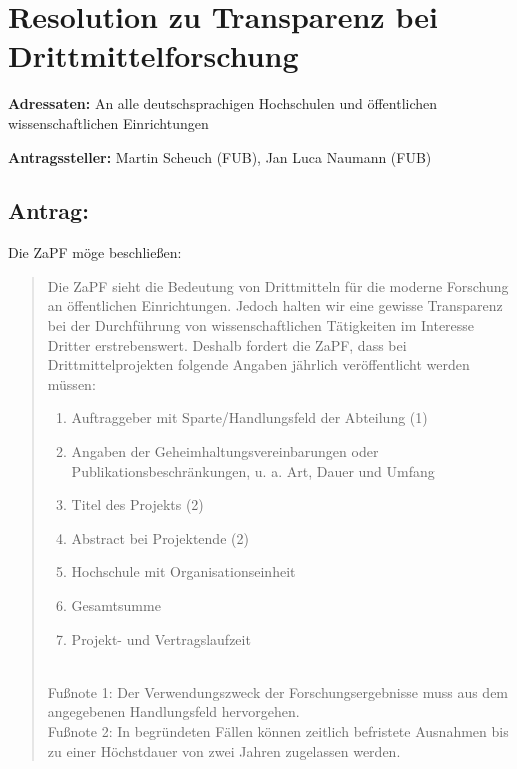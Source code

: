 \documentclass[10pt,oneside]{scrartcl}
\begin{document}
\section*{Resolution zu Transparenz bei Drittmittelforschung}

\textbf{Adressaten:} An alle deutschsprachigen Hochschulen und öffentlichen wissenschaftlichen Einrichtungen

\textbf{Antragssteller:} Martin Scheuch (FUB), Jan Luca Naumann (FUB)

\subsection*{Antrag:}
Die ZaPF möge beschließen:
\begin{quote}
Die ZaPF sieht die Bedeutung von Drittmitteln für die moderne Forschung an öffentlichen Einrichtungen. Jedoch halten wir eine gewisse Transparenz bei der Durchführung von wissenschaftlichen Tätigkeiten im Interesse Dritter erstrebenswert. Deshalb fordert die ZaPF, dass bei Drittmittelprojekten folgende Angaben jährlich veröffentlicht werden müssen:
\begin{enumerate}
\item Auftraggeber mit Sparte/Handlungsfeld der Abteilung (1)
\item Angaben der Geheimhaltungsvereinbarungen oder Publikationsbeschränkungen, u. a. Art, Dauer und Umfang
\item Titel des Projekts (2)
\item Abstract bei Projektende (2)
\item Hochschule mit Organisationseinheit
\item Gesamtsumme
\item Projekt- und Vertragslaufzeit 
\end{enumerate}
~\\
Fußnote 1: Der Verwendungszweck der Forschungsergebnisse muss aus dem angegebenen Handlungsfeld hervorgehen.\\

Fußnote 2: In begründeten Fällen können zeitlich befristete Ausnahmen bis zu einer Höchstdauer von zwei Jahren zugelassen werden.\\


\end{quote}
\end{document}
